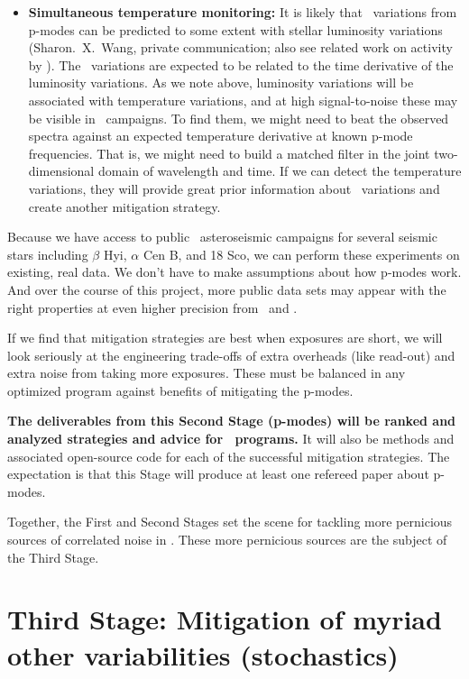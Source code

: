\documentclass[12pt, letterpaper]{article}
\begin{document}
\begin{itemize}
\item
\textbf{Simultaneous temperature monitoring:}
It is likely that \RV\ variations from p-modes can be predicted
to some extent with stellar luminosity variations
(Sharon.~X.~Wang, private communication; also see related work on activity by \citealt{Aigrain}).
The \RV\ variations are expected to be related to the time derivative of the
luminosity variations.
As we note above, luminosity variations will be associated with
temperature variations, and at high signal-to-noise these may be
visible in \EPRV\ campaigns.
To find them, we might need to beat the observed spectra against an
expected temperature derivative at known p-mode frequencies.
That is, we might need to build a matched filter in the joint
two-dimensional domain of wavelength and time.
If we can detect the temperature variations, they will provide great
prior information about \RV\ variations and create another mitigation
strategy.
\end{itemize}

\noindent
Because we have access to public \HARPS\ asteroseismic campaigns for 
several seismic stars including $\beta$ Hyi, $\alpha$ Cen B, and 18 Sco,
we can perform these experiments on existing, real data.
We don't have to make assumptions about how p-modes work.
And over the course of this project, more public data sets may appear
with the right properties at even higher precision from \ESPRESSO\ and \NEID.

If we find that mitigation strategies are best when exposures
are short, we will look seriously at the engineering trade-offs
of extra overheads (like read-out) and extra noise from taking
more exposures. These must be balanced in any optimized program
against benefits of mitigating the p-modes.

\textbf{The deliverables from this Second Stage (p-modes) will be ranked
and analyzed strategies and advice for \EPRV\ programs.} It will
also be methods and associated open-source code for each of the successful
mitigation strategies.
The expectation is that this Stage will produce at least one
refereed paper about p-modes. 

Together, the First and Second Stages set the scene for tackling more
pernicious sources of correlated noise in \EPRV.
These more pernicious sources are the subject of the Third Stage.

\section{Third Stage: Mitigation of myriad other variabilities (stochastics)}
\end{document}
